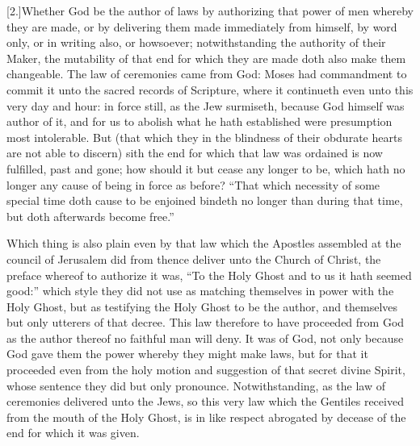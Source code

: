 [2.]Whether God be the author of laws by authorizing that power of men whereby they are made, or by delivering them made immediately from himself, by word only, or in writing also, or howsoever; notwithstanding the authority of their Maker, the mutability of that end for which they are made doth also make them changeable. The law of ceremonies came from God: Moses had commandment to commit it unto the sacred records of Scripture, where it continueth even unto this very day and hour: in force still, as the Jew surmiseth, because God himself was author of it, and for us to abolish what he hath established were presumption most intolerable. But (that which they in the blindness of their obdurate hearts are not able to discern) sith the end for which that law was ordained is now fulfilled, past and gone; how should it but cease any longer to be, which hath no longer any cause of being in force as before? “That which necessity of some special time doth cause to be enjoined bindeth no longer than during that time, but doth afterwards become free.”

Which thing is also plain even by that law which the Apostles assembled at the council of Jerusalem did from thence deliver unto the Church of Christ, the preface whereof to authorize it was, “To the Holy Ghost and to us it hath seemed good:” which style they did not use as matching themselves in power with the Holy Ghost, but as testifying  the Holy Ghost to be the author, and themselves but only utterers of that decree. This law therefore to have proceeded from God as the author thereof no faithful man will deny. It was of God, not only because God gave them the power whereby they might make laws, but for that it proceeded even from the holy motion and suggestion of that secret divine Spirit, whose sentence they did but only pronounce. Notwithstanding, as the law of ceremonies delivered unto the Jews, so this very law which the Gentiles received from the mouth of the Holy Ghost, is in like respect abrogated by decease of the end for which it was given.

